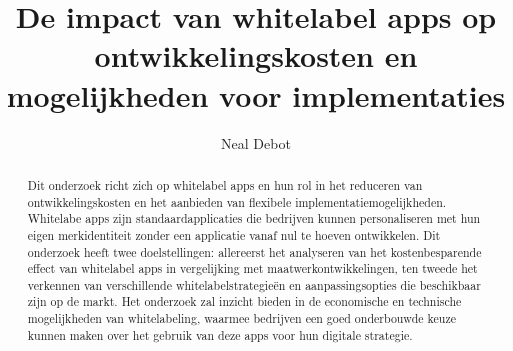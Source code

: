 \documentclass{hogent-article}
\title{De impact van whitelabel apps op ontwikkelingskosten en mogelijkheden voor implementaties}
\author{Neal Debot}
\begin{document}
\begin{abstract}
  Dit onderzoek richt zich op whitelabel apps en hun rol in het reduceren van ontwikkelingskosten en het aanbieden van flexibele implementatiemogelijkheden. 
  Whitelabe apps zijn standaardapplicaties die bedrijven kunnen personaliseren met hun eigen merkidentiteit zonder een applicatie vanaf nul te hoeven ontwikkelen. 
  Dit onderzoek heeft twee doelstellingen: allereerst het analyseren van het kostenbesparende effect van whitelabel apps in vergelijking met maatwerkontwikkelingen, 
  ten tweede het verkennen van verschillende whitelabelstrategieën en aanpassingsopties die beschikbaar zijn op de markt. 
  Het onderzoek zal inzicht bieden in de economische en technische mogelijkheden van whitelabeling, waarmee bedrijven een goed onderbouwde keuze kunnen maken over het gebruik van deze apps voor hun digitale strategie.
\end{abstract}

\tableofcontents



\printbibliography[heading=bibintoc]
\end{document}
